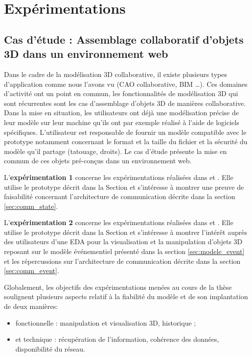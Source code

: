 \chapter{Expérimentations}
\chaptertable

\section{Cas d'étude : Assemblage collaboratif d'objets 3D dans un 
environnement web}
\label{xp:use_case}
Dans le cadre de la modélisation 3D collaborative, il existe plusieurs types 
d'application comme nous l'avons vu (\gls{CAO} collaborative, \gls{BIM} \dots). 
Ces domaines d'activité ont un point en commun, les fonctionnalités de 
modélisation 3D qui sont récurrentes sont les cas d'assemblage d'objets 3D de 
manières collaborative. Dans la mise en situation, les utilisateurs ont déjà une 
modélisation précise de leur modèle sur leur machine qu'ils ont par exemple 
réalisé à l'aide de logiciels spécifiques. L'utilisateur est responsable de fournir un 
modèle compatible avec le prototype notamment concernant le format et la taille 
du fichier et la sécurité du modèle qu'il partage (tatouage, droits). Le cas d'étude 
présente la mise en commun de ces objets pré-conçus dans un environnement 
web.

L'\textbf{expérimentation 1} concerne les expérimentations réalisées dans 
\cite{Desprat2015a} 
et \cite{Desprat2015b}. Elle utilise le prototype décrit dans la Section  et s'intéresse à montrer une preuve de faisabilité concernant l'architecture 
de communication décrite dans la section \ref{sec:comm_state}. 

 
L'\textbf{expérimentation 2} concerne les expérimentations réalisées dans 
\cite{Desprat2016} et 
\cite{Desprat2017}. Elle utilise le prototype décrit dans la Section  
et s'intéresse à montrer l'intérêt auprès des utilisateurs d'une \gls{EDA} pour la 
visualisation et la manipulation d'objets 3D reposant sur le modèle 
événementiel présenté dans la section \ref{sec:modele_event} et les 
répercussions sur l'architecture de 
communication décrite dans la section \ref{sec:comm_event}.

Globalement, les objectifs des expérimentations menées au cours de la thèse 
soulignent plusieurs aspects relatif à la fiabilité 
du modèle et de son implantation de deux manières: 
\begin{itemize}
	\item fonctionnelle : manipulation et visualisation 
	3D, historique ;
	\item et technique : récupération de l'information, cohérence des 
	données, disponibilité du réseau.
\end{itemize}

